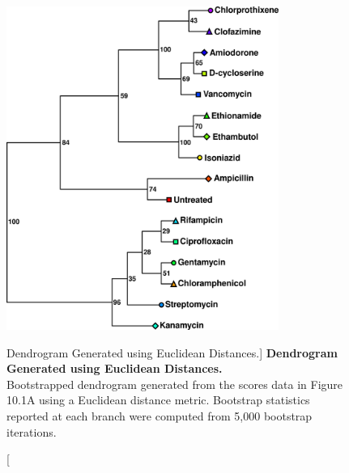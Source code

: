 \begin{figure}
\includegraphics[width=3.5in]{figs/utils/03-tree.png}
\caption
      [Dendrogram Generated using Euclidean Distances.]{
  {\bf Dendrogram Generated using Euclidean Distances.}
  \\
  Bootstrapped dendrogram generated from the scores data in Figure 10.1A using
  a Euclidean distance metric. Bootstrap statistics reported at each branch
  were computed from 5,000 bootstrap iterations.
}
\end{figure}

